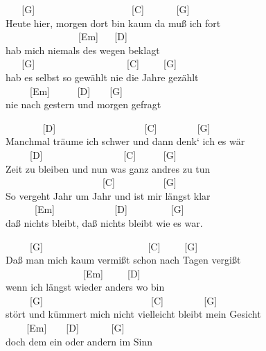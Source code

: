 \documentclass[
  letterpaper,
  twoside=false]{scrbook}
\begin{document}
~ ~ {[}G{]} ~ ~ ~ ~ ~ ~ ~ ~ ~ ~ ~ ~{[}C{]} ~ ~ ~ ~{[}G{]}\\
Heute hier, morgen dort bin kaum da muß ich fort\\
\hspace*{0.333em} ~ ~ ~ ~ ~ ~ ~ ~ ~ {[}Em{]} ~ ~{[}D{]}\\
hab mich niemals des wegen beklagt\\
\hspace*{0.333em} ~ ~ {[}G{]} ~ ~ ~ ~ ~ ~ ~ ~ ~ ~ ~ {[}C{]} ~ ~
~{[}G{]}\\
hab es selbst so gewählt nie die Jahre gezählt\\
\hspace*{0.333em} ~ ~ ~ {[}Em{]} ~ ~ ~ {[}D{]} ~ ~ {[}G{]}\\
nie nach gestern und morgen gefragt

~ ~ ~ ~ ~{[}D{]} ~ ~ ~ ~ ~ ~ ~ ~ ~ ~ ~{[}C{]} ~ ~ ~ ~ ~{[}G{]}\\
Manchmal träume ich schwer und dann denk` ich es wär\\
\hspace*{0.333em} ~ ~ ~ {[}D{]} ~ ~ ~ ~ ~ ~ ~ ~ ~ ~{[}C{]} ~ ~ ~
{[}G{]}\\
Zeit zu bleiben und nun was ganz andres zu tun\\
\hspace*{0.333em} ~ ~ ~ ~ ~ ~ ~ ~ ~ ~ ~ ~ {[}C{]} ~ ~ ~ ~ ~ ~{[}G{]}\\
So vergeht Jahr um Jahr und ist mir längst klar\\
\hspace*{0.333em} ~ ~ ~ ~{[}Em{]} ~ ~ ~ ~ ~ ~ ~ {[}D{]} ~ ~ ~ ~ ~
{[}G{]}\\
daß nichts bleibt, daß nichts bleibt wie es war.

~ ~ ~ {[}G{]} ~ ~ ~ ~ ~ ~ ~ ~ ~ ~ ~ ~ ~{[}C{]} ~ ~ ~{[}G{]}\\
Daß man mich kaum vermißt schon nach Tagen vergißt\\
\hspace*{0.333em} ~ ~ ~ ~ ~ ~ ~ ~ ~ ~{[}Em{]} ~ ~ ~{[}D{]}\\
wenn ich längst wieder anders wo bin\\
\hspace*{0.333em} ~ ~ ~ {[}G{]} ~ ~ ~ ~ ~ ~ ~ ~ ~ ~ ~ ~ ~ {[}C{]} ~ ~ ~
~ ~{[}G{]}\\
stört und kümmert mich nicht vielleicht bleibt mein Gesicht\\
\hspace*{0.333em} ~ ~ ~{[}Em{]} ~ ~ {[}D{]} ~ ~ ~ ~{[}G{]}\\
doch dem ein oder andern im Sinn
\end{document}
